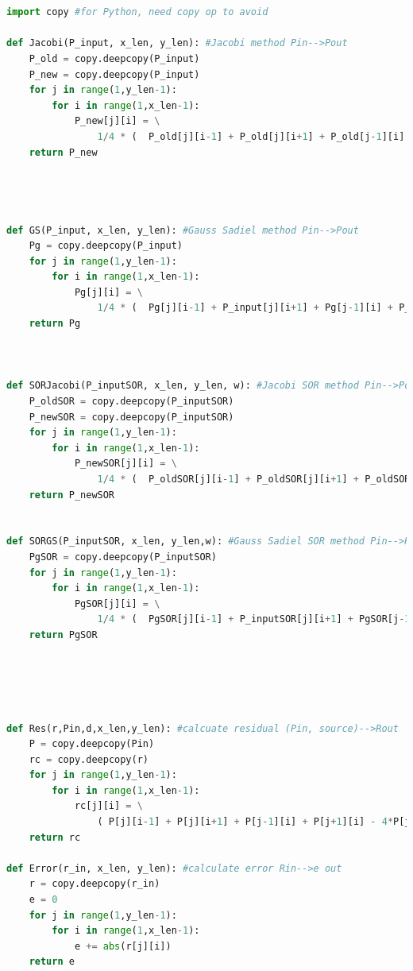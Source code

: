 \documentclass[12pt]{article}
\begin{document}


\begin{scriptsize}
    \begin{lstlisting}[language=python,caption={(2)(IG=0)-The python Source code of Algorithm}]
    
    
import copy #for Python, need copy op to avoid 

def Jacobi(P_input, x_len, y_len): #Jacobi method Pin-->Pout
    P_old = copy.deepcopy(P_input)
    P_new = copy.deepcopy(P_input)
    for j in range(1,y_len-1):
        for i in range(1,x_len-1): 
            P_new[j][i] = \
                1/4 * (  P_old[j][i-1] + P_old[j][i+1] + P_old[j-1][i] + P_old[j+1][i] )
    return P_new




def GS(P_input, x_len, y_len): #Gauss Sadiel method Pin-->Pout
    Pg = copy.deepcopy(P_input)
    for j in range(1,y_len-1):
        for i in range(1,x_len-1): 
            Pg[j][i] = \
                1/4 * (  Pg[j][i-1] + P_input[j][i+1] + Pg[j-1][i] + P_input[j+1][i] )
    return Pg



def SORJacobi(P_inputSOR, x_len, y_len, w): #Jacobi SOR method Pin-->Pout
    P_oldSOR = copy.deepcopy(P_inputSOR)
    P_newSOR = copy.deepcopy(P_inputSOR)
    for j in range(1,y_len-1):
        for i in range(1,x_len-1): 
            P_newSOR[j][i] = \
                1/4 * (  P_oldSOR[j][i-1] + P_oldSOR[j][i+1] + P_oldSOR[j-1][i] + P_oldSOR[j+1][i] ) *w + (1-w)*P_oldSOR[j][i]
    return P_newSOR


def SORGS(P_inputSOR, x_len, y_len,w): #Gauss Sadiel SOR method Pin-->Pout
    PgSOR = copy.deepcopy(P_inputSOR)
    for j in range(1,y_len-1):
        for i in range(1,x_len-1): 
            PgSOR[j][i] = \
                1/4 * (  PgSOR[j][i-1] + P_inputSOR[j][i+1] + PgSOR[j-1][i] + P_inputSOR[j+1][i] )*w + (1-w)*P_inputSOR[j][i]
    return PgSOR





def Res(r,Pin,d,x_len,y_len): #calcuate residual (Pin, source)-->Rout
    P = copy.deepcopy(Pin)
    rc = copy.deepcopy(r)
    for j in range(1,y_len-1):
        for i in range(1,x_len-1): 
            rc[j][i] = \
                ( P[j][i-1] + P[j][i+1] + P[j-1][i] + P[j+1][i] - 4*P[j][i] )/(d**2)
    return rc

def Error(r_in, x_len, y_len): #calculate error Rin-->e out
    r = copy.deepcopy(r_in)
    e = 0
    for j in range(1,y_len-1):
        for i in range(1,x_len-1): 
            e += abs(r[j][i])
    return e



\end{lstlisting}
\end{scriptsize}
\end{document}
